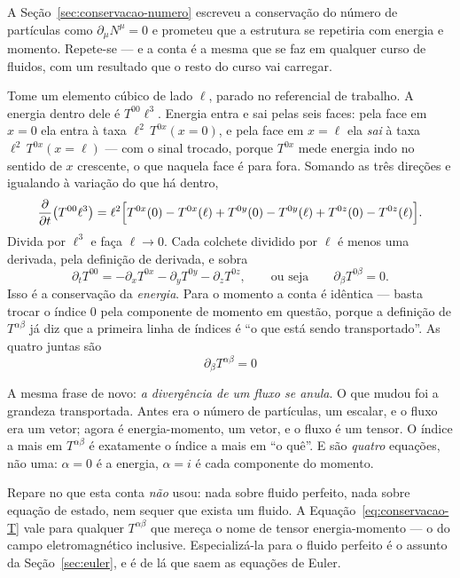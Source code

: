 \documentclass[12pt,a4paper,oneside]{book}
\theoremstyle{rgplain}
\theoremstyle{rgremark}
\begin{document}
A Seção~\ref{sec:conservacao-numero} escreveu a conservação do número de
partículas como $\partial_\mu N^\mu=0$ e prometeu que a estrutura se repetiria
com energia e momento. Repete-se --- e a conta é a mesma que se faz em qualquer curso de fluidos, com um resultado que o resto do curso vai carregar.

Tome um elemento cúbico de lado $\ell$, parado no referencial de trabalho. A
energia dentro dele é $T^{00}\ell^3$. Energia entra e sai pelas seis faces:
pela face em $x=0$ ela entra à taxa $\ell^2\,T^{0x}(x{=}0)$, e pela face em
$x=\ell$ ela \emph{sai} à taxa $\ell^2\,T^{0x}(x{=}\ell)$ --- com o sinal
trocado, porque $T^{0x}$ mede energia indo no sentido de $x$ crescente, o que
naquela face é para fora. Somando as três direções e igualando à variação do
que há dentro,
\[
  \frac{\partial}{\partial t}\bigl(T^{00}\ell^3\bigr)
  =\ell^2\Bigl[T^{0x}(0)-T^{0x}(\ell)+T^{0y}(0)-T^{0y}(\ell)
               +T^{0z}(0)-T^{0z}(\ell)\Bigr] .
\]
Divida por $\ell^3$ e faça $\ell\to0$. Cada colchete dividido por $\ell$ é
menos uma derivada, pela definição de derivada, e sobra
\[
  \partial_t T^{00}
  =-\partial_x T^{0x}-\partial_y T^{0y}-\partial_z T^{0z} ,
  \qquad\text{ou seja}\qquad
  \partial_\beta T^{0\beta}=0 .
\]
Isso é a conservação da \emph{energia}. Para o momento a conta é idêntica ---
basta trocar o índice $0$ pela componente de momento em questão, porque a
definição de $T^{\alpha\beta}$ já diz que a primeira linha de índices é ``o
que está sendo transportado''. As quatro juntas são
\begin{equation}
  \boxed{\ \partial_\beta T^{\alpha\beta}=0\ }
  \label{eq:conservacao-T}
\end{equation}

\begin{central}
A mesma frase de novo: \emph{a divergência de um fluxo se anula}. O que mudou
foi a grandeza transportada. Antes era o número de partículas, um escalar, e o
fluxo era um vetor; agora é energia-momento, um vetor, e o fluxo é um tensor.
O índice a mais em $T^{\alpha\beta}$ é exatamente o índice a mais em ``o quê''.
E são \emph{quatro} equações, não uma: $\alpha=0$ é a energia, $\alpha=i$ é
cada componente do momento.
\end{central}

\begin{atencao}
Repare no que esta conta \emph{não} usou: nada sobre fluido perfeito, nada
sobre equação de estado, nem sequer que exista um fluido. A
Equação~\eqref{eq:conservacao-T} vale para qualquer $T^{\alpha\beta}$ que
mereça o nome de tensor energia-momento --- o do campo eletromagnético
inclusive. Especializá-la para o fluido perfeito é o assunto da
Seção~\ref{sec:euler}, e é de lá que saem as equações de Euler.
\end{atencao}
\end{document}
